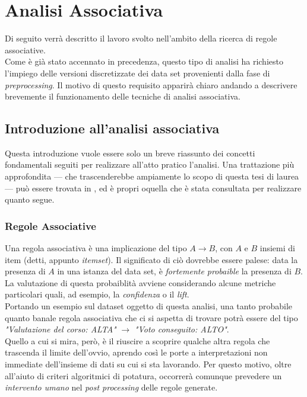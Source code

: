 \chapter{Analisi Associativa}

Di seguito verrà descritto il lavoro svolto nell'ambito della ricerca di regole associative. \\

Come è già stato accennato in precedenza, questo tipo di analisi ha richiesto l'impiego delle versioni discretizzate dei data set provenienti dalla fase di \textit{preprocessing}. Il motivo di questo requisito apparirà chiaro andando a descrivere brevemente il funzionamento delle tecniche di analisi associativa.

\section{Introduzione all'analisi associativa}

    Questa introduzione vuole essere solo un breve riassunto dei concetti fondamentali seguiti per realizzare all'atto pratico l'analisi. Una trattazione più approfondita --- che trascenderebbe  ampiamente lo scopo di questa tesi di laurea --- può essere trovata in \cite{dispense}, ed è propri oquella che è stata consultata per realizzare quanto segue.

    \subsection{Regole Associative}

        Una regola associativa è una implicazione del tipo $A \rightarrow B$, con $A$ e $B$ insiemi di item (detti, appunto \textit{itemset}). Il significato di ciò dovrebbe essere palese: data la presenza di $A$ in una istanza del data set, è \textit{fortemente probaible} la presenza di $B$. La valutazione di questa probaiblità avviene considerando alcune metriche particolari quali, ad esempio, la \textit{confidenza} o il \textit{lift}. \\

        Portando un esempio sul dataset oggetto di questa analisi, una tanto probabile quanto banale regola associativa che ci si aspetta di trovare potrà essere del tipo \textit{"Valutazione del corso: ALTA"} $\rightarrow$ \textit{"Voto conseguito: ALTO"}. \\
        
        Quello a cui si mira, però, è il riuscire a scoprire qualche altra regola che trascenda il limite dell'ovvio, aprendo così le porte a interpretazioni non immediate dell'insieme di dati su cui si sta lavorando. Per questo motivo, oltre all'aiuto di criteri algoritmici di potatura, occorrerà comunque prevedere un \textit{intervento umano} nel \textit{post processing} delle regole generate.

